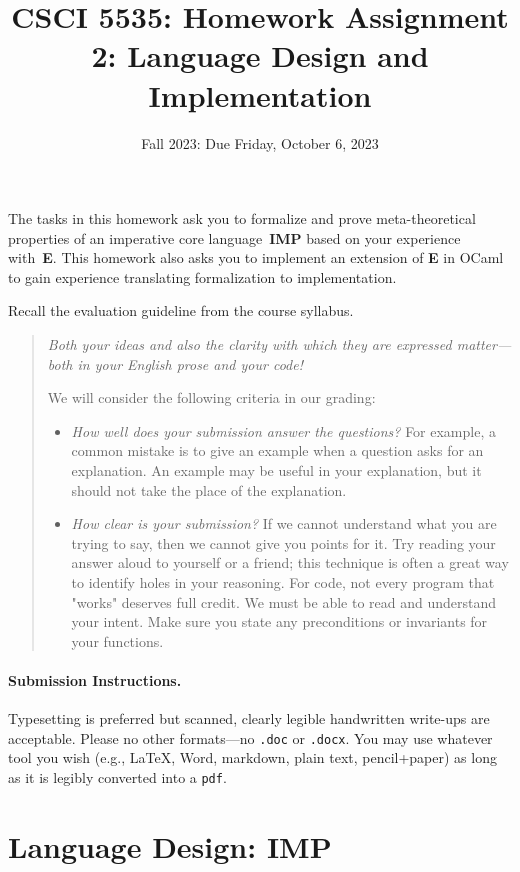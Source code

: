 \documentclass[12pt]{exam}
\title{CSCI 5535: Homework Assignment 2: Language Design and Implementation}
\date{Fall 2023: Due Friday, October 6, 2023}
\author{}
\newcommand{\IMP}{\textbf{\textsf{IMP}}\xspace}
\newcommand{\E}{\textbf{\textsf{E}}\xspace}
\begin{document}
\maketitle

The tasks in this homework ask you to formalize and prove meta-theoretical properties of an imperative core language~\IMP based on your experience with~\E.
%
This homework also asks you to implement an extension of \E in OCaml to gain experience translating formalization to implementation.

Recall the evaluation guideline from the course syllabus.
\begin{quote}\em
  Both your ideas and also the clarity with which they are expressed
  matter---both in your English prose and your code!

  We will consider the following criteria in our grading: 
  \begin{itemize}
    \item \emph{How well does your submission answer the questions?}
      For example, a common mistake is to give an example when a question
      asks for an explanation.  An example may be useful in your
      explanation, but it should not take the place of the explanation.
    \item \emph{How clear is your submission?}  If we cannot
      understand what you are trying to say, then we cannot give you
      points for it.  Try reading your answer aloud to yourself or a
      friend; this technique is often a great way to identify holes in
      your reasoning.  For code, not every program that "works"
      deserves full credit. We must be able to read and understand
      your intent.  Make sure you state any preconditions or
      invariants for your functions.
  \end{itemize}
\end{quote}

\paragraph{Submission Instructions.}

Typesetting is preferred but scanned, clearly legible handwritten write-ups are acceptable. Please no other formats---no
\texttt{.doc} or \texttt{.docx}. You may use whatever tool you wish (e.g., \LaTeX, Word, markdown, plain text, pencil+paper) as long as it is legibly
converted into a \texttt{pdf}.

\section{Language Design: \IMP}
\end{document}
